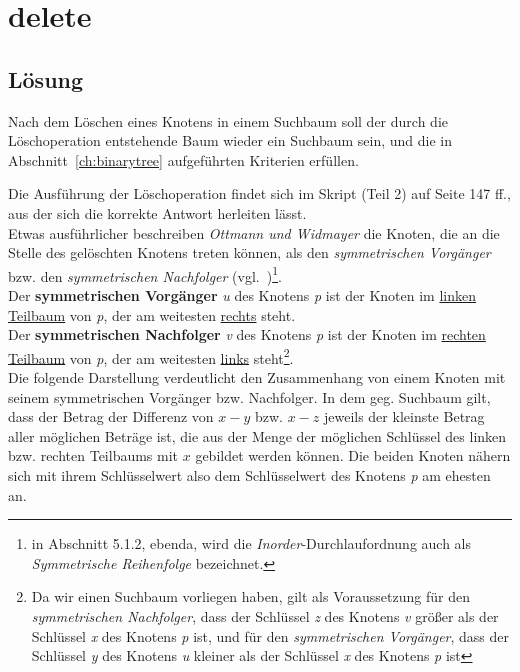 \chapter{delete}

\section*{Lösung}

Nach dem Löschen eines Knotens in einem Suchbaum soll der durch die Löschoperation entstehende Baum wieder ein Suchbaum sein, und die in Abschnitt~\ref{ch:binarytree} aufgeführten Kriterien erfüllen.

Die Ausführung der Löschoperation findet sich im Skript (Teil 2) auf Seite 147 ff., aus der sich die korrekte Antwort herleiten lässt.
\\

Etwas ausführlicher beschreiben \textit{Ottmann und Widmayer} die Knoten, die an die Stelle des gelöschten Knotens treten können, als den \textit{symmetrischen Vorgänger} bzw. den \textit{symmetrischen Nachfolger} (vgl.~\cite[288 f.]{OW17e})\footnote{
in Abschnitt 5.1.2, ebenda, wird die \textit{Inorder}-Durchlaufordnung auch als \textit{Symmetrische Reihenfolge} bezeichnet.
}.
\\

Der \textbf{symmetrischen Vorgänger} \textit{u} des Knotens \textit{p} ist der Knoten im \underline{linken Teilbaum} von \textit{p}, der am weitesten \underline{rechts} steht.
\\

Der \textbf{symmetrischen Nachfolger} \textit{v} des Knotens \textit{p} ist der Knoten im \underline{rechten Teilbaum} von \textit{p}, der am weitesten \underline{links} steht\footnote{
    Da wir einen Suchbaum vorliegen haben, gilt als Voraussetzung für den \textit{symmetrischen Nachfolger}, dass der Schlüssel \textit{z} des Knotens \textit{v} größer als der Schlüssel \textit{x} des Knotens \textit{p} ist, und für den \textit{symmetrischen Vorgänger}, dass der Schlüssel \textit{y} des Knotens \textit{u}  kleiner als der Schlüssel \textit{x} des Knotens \textit{p} ist
}.
\\

Die folgende Darstellung verdeutlicht den Zusammenhang von einem Knoten mit seinem symmetrischen Vorgänger {bzw.} Nachfolger.
In dem  {geg.} Suchbaum gilt, dass der Betrag der Differenz von $x - y$ bzw. $x - z$ jeweils der kleinste Betrag aller möglichen Beträge ist, die aus der Menge der möglichen Schlüssel des linken {bzw.} rechten Teilbaums mit $x$ gebildet werden können.
Die beiden Knoten nähern sich mit ihrem Schlüsselwert also dem Schlüsselwert des Knotens \textit{p} am ehesten an.


